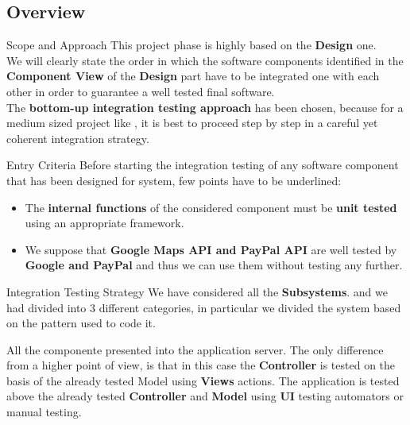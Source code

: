 \documentclass{../Common/Structure/pdf_presentation}
\begin{document}
	\subsection{Overview}
	\begin{frame}{Scope and Approach}
		This project phase is highly based on the \textbf{Design} one. \\
		\medskip
		We will clearly state the order in which the software components identified in the \textbf{Component View} of the \textbf{Design} part have to be integrated one with each other in order to guarantee a well tested final software.\\
		\medskip
		The \textbf{bottom-up integration testing approach} has been chosen, because for a medium sized project like \PowerEnJoy{}, it is best to proceed step by step in a careful yet coherent integration strategy.\\
	\end{frame}
	\begin{frame}{Entry Criteria}
		Before starting the integration testing of any software component that has been designed for \PowerEnJoy{} system, few points have to be underlined:
		\begin{itemize}
			 \item The \textbf{internal functions} of the considered component must be \textbf{unit tested} using an appropriate framework.
			 \item We suppose that \textbf{Google Maps API and PayPal API} are well tested by \textbf{Google and PayPal} and thus we can use them without testing any
			 further.
		\end{itemize}
	\end{frame}
	\begin{frame}{Integration Testing Strategy}
		We have considered all the \textbf{Subsystems}. and we had divided into 3 different categories, in particular we divided the system based on the pattern used to code it.\\
		\medskip
		\begin{itemize}
			 All the componente presented into the application server.
			 The only difference from a higher point of view, is that in this case the \textbf{Controller} is tested on the basis of the already tested Model using \textbf{Views} actions.
			 The application is tested above the already tested \textbf{Controller} and \textbf{Model} using \textbf{UI} testing automators or manual testing.
		\end{itemize}
	\end{frame}
\end{document}
